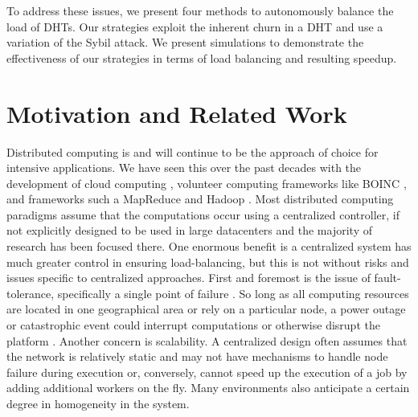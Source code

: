 \documentclass[10pt,conference]{IEEEtran}
\begin{document}
To address these issues, we present four methods to autonomously balance the load of DHTs. Our strategies exploit the inherent churn in a DHT and use a variation of the Sybil attack. We present simulations to demonstrate the effectiveness of our strategies in terms of load balancing and resulting speedup.

\section{Motivation and Related Work}

Distributed computing is and will continue to be the approach of choice for intensive applications.
We have seen this over the past decades with the development of cloud computing \cite{p2p-cloud}, volunteer computing frameworks like BOINC \cite{shvachko2010hadoop}, and frameworks such a MapReduce\cite{mapreduce} and Hadoop \cite{hadoop}.
Most distributed computing paradigms assume that the computations occur using a centralized controller, if not explicitly designed to be used in large datacenters \cite{hadoopAssumptions} and the majority of research has been focused there.
One enormous benefit is a centralized system has much greater control in ensuring load-balancing, but this is not without risks and issues specific to centralized approaches.
First and foremost is the issue of fault-tolerance, specifically a single point of failure \cite{shvachko2010hadoop}.
So long as all computing resources are located in one geographical area or rely on a particular node, a power outage or catastrophic event could interrupt computations or otherwise disrupt the platform \cite{babaoglu2014people}. Another concern is scalability.
A centralized design often assumes that the network is relatively static and may not have mechanisms to handle node failure during execution or, conversely, cannot speed up the execution of a job by adding additional workers on the fly.
Many environments also anticipate a certain degree in homogeneity in the system.
\end{document}
